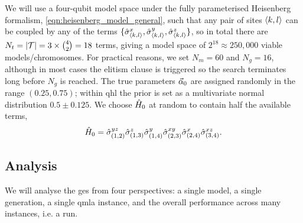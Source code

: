 {We will use a four-qubit \gls{model space} under the fully parameterised Heisenberg formalism, \cref{eqn:heisenberg_model_general}, 
    such that any pair of sites ${ \langle k, l \rangle }$ can be coupled by any of the terms $\{\hat{\sigma}^x_{{ \langle k, l \rangle }}, \hat{\sigma}^y_{{ \langle k, l \rangle }}, \hat{\sigma}^z_{{ \langle k, l \rangle }}\}$, 
    so in total there are $N_t = |\mathcal{T}| = 3 \times {4 \choose 2} = 18$ terms, 
    giving a \gls{model space} of $2^{18} \approx 250,000$ viable models/chromosomes. 
For practical reasons\footnotemark, we set $N_m=60$ and $N_g=16$, although in most cases the 
    elitism clause is triggered so the search terminates long before $N_g$ is reached. 
The true parameters $\vec{\alpha}_0$ are assigned randomly in the range $(0.25, 0.75)$; 
    within \gls{qhl} the prior is set as a multivariate normal distribution $0.5 \pm 0.125$. 
We choose $\hat{H}_0$ at random to contain half the available terms\footnotemark,
\begin{equation}
    \label{eqn:gen_alg_true_model}
    \hat{H}_0 = \hat{\sigma}_{(1, 2)}^{yz}\hat{\sigma}_{(1, 3)}^{z}\hat{\sigma}_{(1, 4)}^{y}\hat{\sigma}_{(2, 3)}^{xy}\hat{\sigma}_{(2, 4)}^{x}\hat{\sigma}_{(3, 4)}^{xz}.
\end{equation} 
\par 
\subsection{Analysis}
We will analyse the \gls{ges} from four perspectives: 
    a single model, a single generation, a single \gls{qmla} \gls{instance}, 
    and the overall performance across many instances, i.e. a \gls{run}.
\par 

}
